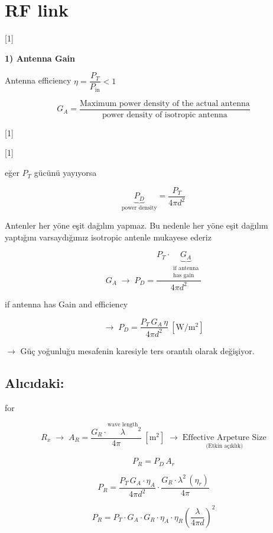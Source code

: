 \documentclass[11pt,a4paper]{article}
\begin{document}

\section{RF link}

[1]

\textbf{1) Antenna Gain}

Antenna efficiency \quad $\eta = \dfrac{P_T}{P_{\mathrm{in}}} < 1$

\[ G_A = \frac{\text{Maximum power density of the actual antenna}}{\text{power density of isotropic antenna}} \]

[1]

[1]

eğer $P_T$ gücünü yayıyorsa

\[ \underbrace{P_D}_{\text{power density}} = \frac{P_T}{4\pi d^2} \]

Antenler her yöne eşit dağılım yapmaz. Bu nedenle her yöne eşit dağılım yaptığını varsaydığımız isotropic antenle mukayese ederiz

\[ G_A \;\rightarrow\; P_D = \frac{P_T\cdot \underbrace{G_A}_{\substack{\text{if antenna}\\ \text{has gain}}}}{4\pi d^2} \]

if antenna has Gain and efficiency

\[ \rightarrow\; P_D = \frac{P_T\,G_A\,\eta}{4\pi d^2}\ [\mathrm{W/m^2}] \]

$\rightarrow$ Güç yoğunluğu mesafenin karesiyle ters orantılı olarak değişiyor.

\subsection{Alıcıdaki:}

for

\[ R_x \;\rightarrow\; A_R = \frac{G_R\cdot\overset{\text{wave length}}{\lambda}{}^{2}}{4\pi}\ [\mathrm{m^2}] \;\rightarrow\; \underset{\text{(Etkin açıklık)}}{\text{Effective Arpeture Size}} \]

\[ P_R = P_D\,A_r \]

\[ P_R = \frac{P_T\,G_A\cdot\eta_A}{4\pi d^2}\cdot\frac{G_R\cdot\lambda^2\,(\eta_r)}{4\pi} \]

\[ P_R = P_T\cdot G_A\cdot G_R\cdot\eta_A\cdot\eta_R\left(\frac{\lambda}{4\pi d}\right)^2 \]
\end{document}
